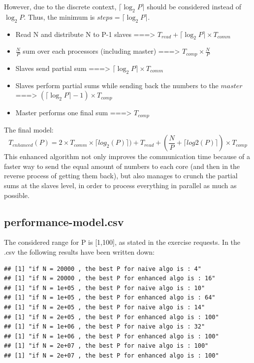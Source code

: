 \documentclass[
  10pt,
]{article}
\providecommand{\tightlist}{%
  \setlength{\itemsep}{0pt}\setlength{\parskip}{0pt}}
\begin{document}
However, due to the discrete context, \(\lceil{\log_{2}{P}}\rceil\)
should be considered instead of \(\log_2{P}\). Thus, the minimum is
\(steps=\lceil{\log_{2}{P}}\rceil\).

\begin{itemize}
\tightlist
\item
  Read N and distribute N to P-1 slaves ===\textgreater{}
  \(T_{read}+\lceil{\log_{2}{P}}\rceil \times T_{comm}\)
\item
  \(\frac{N}{P}\) sum over each processors (including master)
  ===\textgreater{} \(T_{comp}\times\frac{N}{P}\)
\item
  Slaves send partial sum ===\textgreater{}
  \(\lceil{\log_{2}{P}}\rceil \times T_{comm}\)
\item
  Slaves perform partial sums while sending back the numbers to the
  \(master\) ===\textgreater{}
  \((\lceil{\log_{2}{P}}\rceil-1) \times T_{comp}\)
\item
  Master performs one final sum ===\textgreater{} \(T_{comp}\)
\end{itemize}

The final model:
\[T_{enhanced}(P)= 2\times T_{comm}\times \lceil{log_2(P)}\rceil)+T_{read}+(\frac{N}{P}+\lceil{log2(P)}\rceil)\times T_{comp}\]
This enhanced algorithm not only improves the communication time because
of a faster way to send the equal amount of numbers to each core (and
then in the reverse process of getting them back), but also manages to
crunch the partial sums at the slaves level, in order to process
everything in parallel as much as possible.

\hypertarget{performance-model.csv}{%
\subsection{performance-model.csv}\label{performance-model.csv}}

The considered range for P is {[}1,100{]}, as stated in the exercise
requests. In the .csv the following results have been written down:

\begin{verbatim}
## [1] "if N = 20000 , the best P for naive algo is : 4"
## [1] "if N = 20000 , the best P for enhanced algo is : 16"
## [1] "if N = 1e+05 , the best P for naive algo is : 10"
## [1] "if N = 1e+05 , the best P for enhanced algo is : 64"
## [1] "if N = 2e+05 , the best P for naive algo is : 14"
## [1] "if N = 2e+05 , the best P for enhanced algo is : 100"
## [1] "if N = 1e+06 , the best P for naive algo is : 32"
## [1] "if N = 1e+06 , the best P for enhanced algo is : 100"
## [1] "if N = 2e+07 , the best P for naive algo is : 100"
## [1] "if N = 2e+07 , the best P for enhanced algo is : 100"
\end{verbatim}
\end{document}
